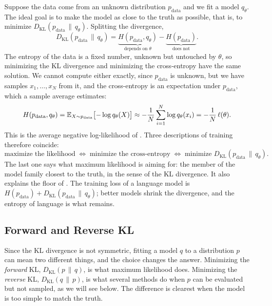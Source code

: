 Suppose the data come from an unknown distribution $p_{\text{data}}$ and
we fit a model $q_\theta$. The ideal goal is to make the model as close
to the truth as possible, that is, to minimize $D_{\mathrm{KL}}(p_{\text{data}}
\,\|\, q_\theta)$. Splitting the divergence,
\[
  D_{\mathrm{KL}}(p_{\text{data}} \,\|\, q_\theta)
  = \underbrace{H(p_{\text{data}}, q_\theta)}_{\text{depends on } \theta}
  - \underbrace{H(p_{\text{data}})}_{\text{does not}} .
\]
The entropy of the data is a fixed number, unknown but untouched by
$\theta$, so minimizing the KL divergence and minimizing the
cross-entropy have the same solution. We cannot compute either exactly,
since $p_{\text{data}}$ is unknown, but we have samples $x_1, \dots, x_N$
from it, and the cross-entropy is an expectation under $p_{\text{data}}$,
which a sample average estimates:
\[
  H(p_{\text{data}}, q_\theta)
  = \mathbb{E}_{X \sim p_{\text{data}}}\bigl[-\log q_\theta(X)\bigr]
  \approx -\frac{1}{N} \sum_{i=1}^{N} \log q_\theta(x_i)
  = -\frac{1}{N}\, \ell(\theta) .
\]
This is the average negative log-likelihood of . Three
descriptions of training therefore coincide:
\[
  \text{maximize the likelihood}
  \;\Longleftrightarrow\;
  \text{minimize the cross-entropy}
  \;\Longleftrightarrow\;
  \text{minimize } D_{\mathrm{KL}}(p_{\text{data}} \,\|\, q_\theta) .
\]
The last one says what maximum likelihood is aiming for: the member of
the model family closest to the truth, in the sense of the KL divergence.
It also explains the floor of . The training loss of
a language model is $H(p_{\text{data}}) + D_{\mathrm{KL}}(p_{\text{data}}
\,\|\, q_\theta)$; better models shrink the divergence, and the entropy
of language is what remains.

\subsection{Forward and Reverse KL}
\label{sec:ch07-kl-direction}

Since the KL divergence is not symmetric, fitting a model $q$ to a
distribution $p$ can mean two different things, and the choice changes
the answer. Minimizing the \emph{forward} KL, $D_{\mathrm{KL}}(p \,\|\,
q)$, is what maximum likelihood does. Minimizing the \emph{reverse} KL,
$D_{\mathrm{KL}}(q \,\|\, p)$, is what several methods do when $p$ can be
evaluated but not sampled, as we will see below. The difference is
clearest when the model is too simple to match the truth.

